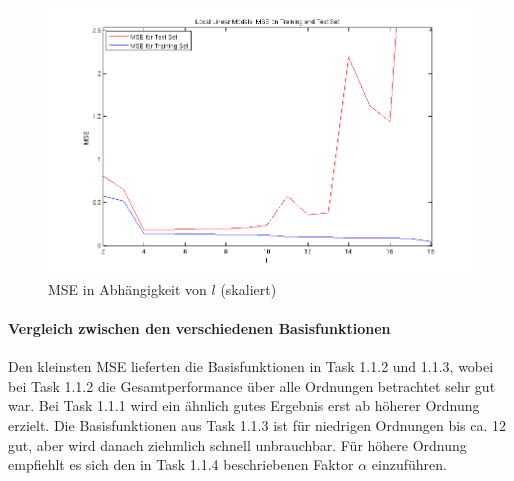 \begin{figure}[h!]
  \centering
  \includegraphics[width=\textwidth]{./figures/1_1_3_mse_in.png}
  \caption{MSE in Abhängigkeit von $l$ (skaliert)}
  \label{fig:113-mse-in}
\end{figure}

\clearpage

\paragraph{Vergleich zwischen den verschiedenen Basisfunktionen}

Den kleinsten MSE lieferten die Basisfunktionen in Task 1.1.2 und 1.1.3, wobei bei Task 1.1.2 die Gesamtperformance
über alle Ordnungen betrachtet sehr gut war. Bei Task 1.1.1 wird ein ähnlich gutes Ergebnis erst ab höherer Ordnung
erzielt. Die Basisfunktionen aus Task 1.1.3 ist für niedrigen Ordnungen bis ca. 12 gut, aber wird danach ziehmlich
schnell unbrauchbar. Für höhere Ordnung empfiehlt es sich den in Task 1.1.4 beschriebenen Faktor $\alpha$ einzuführen.
